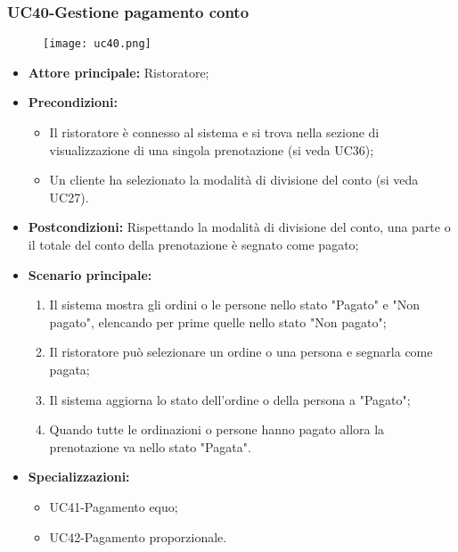 \subsubsection{UC40-Gestione pagamento conto}
\begin{figure}[h] \texttt{[image: uc40.png]} \end{figure}
\begin{itemize}
    \item \textbf{Attore principale:} Ristoratore;
    \item \textbf{Precondizioni:}
    \begin{itemize}
        \item Il ristoratore è connesso al sistema e si trova nella sezione di visualizzazione di una singola prenotazione (si veda UC36);
        \item Un cliente ha selezionato la modalità di divisione del conto (si veda UC27).
    \end{itemize}
    \item \textbf{Postcondizioni:} Rispettando la modalità di divisione del conto, una parte o il totale del conto della prenotazione è segnato come pagato;
    \item \textbf{Scenario principale:}
    \begin{enumerate}
        \item Il sistema mostra gli ordini o le persone nello stato "Pagato" e "Non pagato", elencando per prime quelle nello stato "Non pagato";
        \item Il ristoratore può selezionare un ordine o una persona e segnarla come pagata;
        \item Il sistema aggiorna lo stato dell'ordine o della persona a "Pagato";
        \item Quando tutte le ordinazioni o persone hanno pagato allora la prenotazione va nello stato "Pagata".
    \end{enumerate}
    \item \textbf{Specializzazioni:}
        \begin{itemize}
            \item UC41-Pagamento equo;
            \item UC42-Pagamento proporzionale.
        \end{itemize}
\end{itemize}

